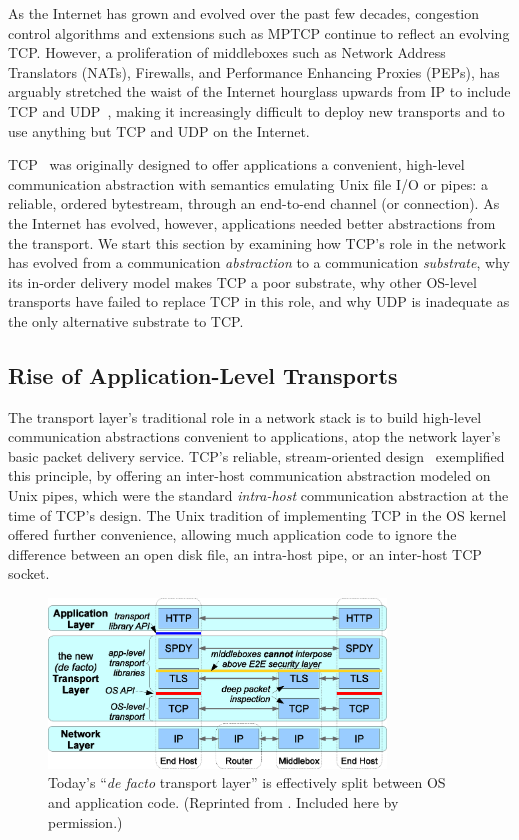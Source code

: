 \def\utcp{$u$TCP\xspace}
\def\utls{$u$TLS\xspace}
\def\ucobs{$u$COBS\xspace}

As the Internet has grown and evolved
over the past few decades,
congestion control algorithms and extensions such as MPTCP
continue to reflect an evolving TCP.
However,
a proliferation of middleboxes
such as 
Network Address Translators (NATs), 
Firewalls,
and 
Performance Enhancing Proxies (PEPs),
has arguably stretched the waist of the Internet hourglass
upwards from IP
to include
TCP and UDP~\cite{rosenberg08udp, ford08breaking, popa10http},
making it increasingly difficult
to deploy new transports
and to
use anything but TCP and UDP 
on the Internet.

TCP~\cite{rfc793} was originally designed to offer applications
a convenient, high-level communication abstraction
with semantics emulating Unix file I/O or pipes:
a reliable, ordered bytestream,
through an end-to-end channel (or connection).
As the Internet has evolved, however,
applications needed better abstractions
from the transport.
We start this section by examining
how TCP's role in the network has evolved
from a communication {\em abstraction} to a communication {\em substrate},
why its in-order delivery model makes TCP a poor substrate,
why other OS-level transports have failed to replace TCP in this role,
and why UDP is inadequate as the only alternative substrate to TCP.

\subsection{Rise of Application-Level Transports}

The transport layer's traditional role in a network stack
is to build high-level communication abstractions
convenient to applications,
atop the network layer's basic packet delivery service.
TCP's reliable, stream-oriented design~\cite{rfc793}
exemplified this principle,
by offering an inter-host communication abstraction
modeled on Unix pipes,
which were the standard {\em intra-host} communication abstraction
at the time of TCP's design.
The Unix tradition of
implementing TCP in the OS kernel
offered further convenience,
allowing much application code to ignore the difference between
an open disk file, an intra-host pipe, or an inter-host TCP socket.

\begin{figure}[tbp]
\centering
\includegraphics[width=0.8\textwidth]{figures/layers.eps}
\caption{Today's ``{\em de facto} transport layer''
	is effectively split between OS and application code. (Reprinted from
    \cite{nowlan12fitting}. Included here by permission.)}
\label{f:layers}
\end{figure}

